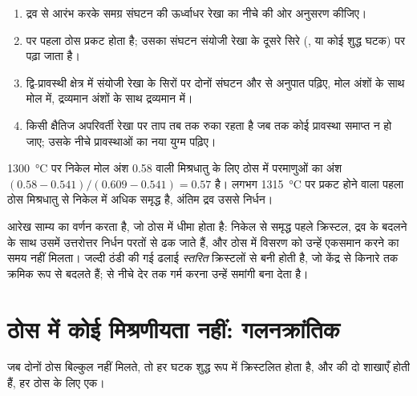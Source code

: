 \begin{method}[ठोस--द्रव आरेख पढ़ना]\label{met:b2:solid-liquid-diagrams:read-solid-liquid}
\begin{enumerate}
  \item द्रव से आरंभ करके समग्र संघटन की ऊर्ध्वाधर रेखा का नीचे की ओर
        अनुसरण कीजिए।
  \item {} पर पहला ठोस प्रकट होता है; उसका संघटन संयोजी रेखा के
        दूसरे सिरे (, या कोई शुद्ध घटक) पर पढ़ा जाता है।
  \item द्वि-प्रावस्थी क्षेत्र में संयोजी रेखा के सिरों पर दोनों संघटन
        और  से अनुपात पढ़िए, मोल अंशों के साथ मोल में,
        द्रव्यमान अंशों के साथ द्रव्यमान में।
  \item किसी क्षैतिज अपरिवर्ती रेखा पर ताप तब तक रुका रहता है जब तक कोई प्रावस्था
        समाप्त न हो जाए; उसके नीचे प्रावस्थाओं का नया युग्म पढ़िए।
\end{enumerate}
\end{method}

\begin{example}\label{ex:b2:solid-liquid-diagrams:lever}
\qty{1300}{\degreeCelsius} पर निकेल मोल अंश 0.58 वाली मिश्रधातु के लिए
ठोस में परमाणुओं का अंश $(0.58 - 0.541)/(0.609 - 0.541) = 0.57$ है।
लगभग \qty{1315}{\degreeCelsius} पर प्रकट होने वाला पहला ठोस मिश्रधातु से निकेल में
अधिक समृद्ध है, अंतिम द्रव उससे निर्धन।
\end{example}

आरेख साम्य का वर्णन करता है, जो ठोस में धीमा होता है: निकेल से समृद्ध पहले क्रिस्टल,
द्रव के बदलने के साथ उसमें उत्तरोत्तर निर्धन परतों से ढक जाते हैं,
और ठोस में विसरण को उन्हें एकसमान करने का समय नहीं मिलता। जल्दी ठंडी की गई
ढलाई \textit{स्तरित} क्रिस्टलों से बनी होती है, जो केंद्र से किनारे तक क्रमिक
रूप से बदलते हैं;  से नीचे देर तक गर्म करना उन्हें समांगी बना देता है।

\section{ठोस में कोई मिश्रणीयता नहीं: गलनक्रांतिक}

जब दोनों ठोस बिल्कुल नहीं मिलते, तो हर घटक शुद्ध रूप में क्रिस्टलित होता है, और
 की दो शाखाएँ होती हैं, हर ठोस के लिए एक।

